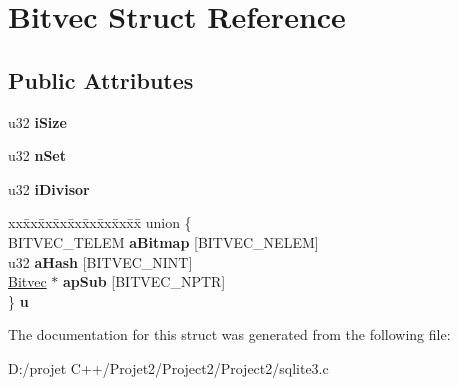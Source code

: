 \hypertarget{struct_bitvec}{}\section{Bitvec Struct Reference}
\label{struct_bitvec}
\subsection*{Public Attributes}
\begin{DoxyCompactItemize}
\item 
\mbox{\label{struct_bitvec_ab36df8ece98aee080bae6de28c237de8}} 
u32 {\bfseries i\+Size}
\item 
\mbox{\label{struct_bitvec_ad6811debae9b972f2d94d667e994e3f6}} 
u32 {\bfseries n\+Set}
\item 
\mbox{\label{struct_bitvec_a22cdb23eb424e07b6ce922de018a83d9}} 
u32 {\bfseries i\+Divisor}
\item 
\mbox{\label{struct_bitvec_a15551c7df4f51e17f560bfd038bcfdcb}} 
\begin{tabbing}
xx\=xx\=xx\=xx\=xx\=xx\=xx\=xx\=xx\=\kill
union \{\\
\>BITVEC\_TELEM {\bfseries aBitmap} \mbox{[}BITVEC\_NELEM\mbox{]}\\
\>u32 {\bfseries aHash} \mbox{[}BITVEC\_NINT\mbox{]}\\
\>\mbox{\hyperlink{struct_bitvec}{Bitvec}} $\ast$ {\bfseries apSub} \mbox{[}BITVEC\_NPTR\mbox{]}\\
\} {\bfseries u}\\

\end{tabbing}\end{DoxyCompactItemize}


The documentation for this struct was generated from the following file\+:\begin{DoxyCompactItemize}
\item 
D\+:/projet C++/\+Projet2/\+Project2/\+Project2/sqlite3.\+c\end{DoxyCompactItemize}
